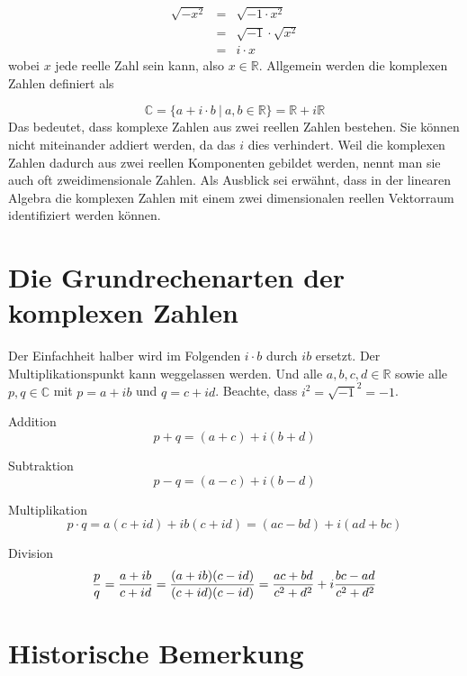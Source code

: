 \begin{eqnarray*}
\sqrt{-x^2} &=& \sqrt{-1\cdot x^2}\\
&=& \sqrt{-1}\cdot \sqrt{x^2}\\
&=& i \cdot x
\end{eqnarray*}
wobei $x$ jede reelle Zahl sein kann, also $x\in \mathbb{R}$. Allgemein werden die komplexen Zahlen definiert als 

\[ \mathbb{C} = \{ a+i\cdot b \ |\ a,b \in \mathbb{R} \} = \mathbb{R}+i\mathbb{R} \]
Das bedeutet, dass komplexe Zahlen aus zwei reellen Zahlen bestehen. Sie können nicht miteinander addiert werden, da das $i$ dies verhindert. Weil die komplexen Zahlen dadurch aus zwei reellen Komponenten gebildet werden, nennt man sie auch oft zweidimensionale Zahlen. Als Ausblick sei erwähnt, dass in der linearen Algebra die komplexen Zahlen mit einem zwei dimensionalen reellen Vektorraum identifiziert werden können.

\section{Die Grundrechenarten der komplexen Zahlen}

Der Einfachheit halber wird im Folgenden $i\cdot b$ durch $ib$ ersetzt. Der Multiplikationspunkt kann weggelassen werden. Und alle $a,b,c,d \in \mathbb{R}$ sowie alle $p,q \in \mathbb{C}$ mit $p = a+ib$ und $q = c+id$. Beachte, dass $i^2=\sqrt{-1}^2 = -1$.

\begin{definition} Addition
\[ p+q = (a+c)+i(b+d)\]
\end{definition}

\begin{definition} Subtraktion
\[ p-q = (a-c)+i(b-d)\]
\end{definition}

\begin{definition} Multiplikation
\[ p\cdot q = a(c+id)+ib(c+id) = (ac-bd)+i(ad+bc)  \]
\end{definition}

\begin{definition} Division
\[ {p\over q} = {a+ib \over c+id} = {(a+ib)(c-id) \over (c+id)(c-id)} = {ac+bd\over c^2+d^2} + i{bc-ad \over c^2+d^2}\]
\end{definition}

\section{Historische Bemerkung} 

